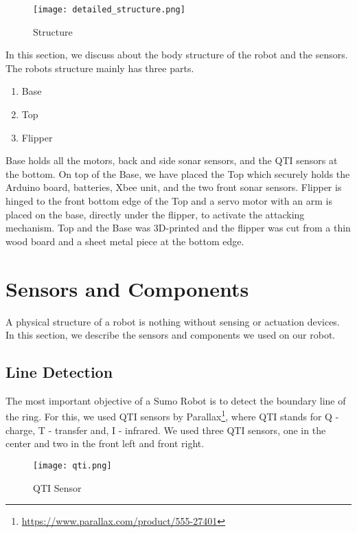 \documentclass[11pt, letterpaper, oneside]{article}
\begin{document}
\begin{figure}[bth]
	\begin{center}
		\texttt{[image: detailed\_structure.png]}
		\caption{Structure}
		\label{fig:detailed_structure}
	\end{center}
\end{figure}

In this section, we discuss about the body structure of the robot and the sensors. The robots structure mainly has three parts. 
\begin{enumerate}
	\item Base
	\item Top
	\item Flipper
\end{enumerate}


Base holds all the motors, back and side sonar sensors, and the QTI sensors at the bottom. On top of the Base, we have placed the Top which securely holds the Arduino board, batteries, Xbee unit, and the two front sonar sensors. Flipper is hinged to the front bottom edge of the Top and a servo motor with an arm is placed on the base, directly under the flipper, to activate the attacking mechanism. Top and the Base was 3D-printed and the flipper was cut from a thin wood board and a sheet metal piece at the bottom edge.



\newpage
\section{Sensors and Components}
A physical structure of a robot is nothing without sensing or actuation devices. In this section, we describe the sensors and components we used on our robot. \\

\subsection{Line Detection}
The most important objective of a Sumo Robot is to detect the boundary line of the ring. For this, we used QTI sensors by Parallax\footnote{\url{https://www.parallax.com/product/555-27401}}, where QTI stands for Q - charge, T - transfer and, I - infrared. We used three QTI sensors, one in the center and two in the front left and front right.
\begin{figure}[bth]
	\begin{center}
		\texttt{[image: qti.png]}
		\caption{QTI Sensor}
		\label{fig:qti}
	\end{center}
\end{figure}
\end{document}
